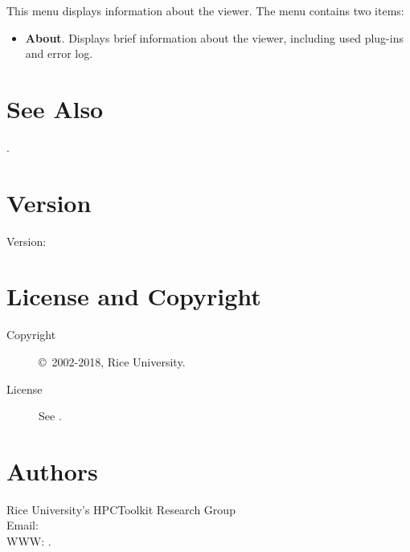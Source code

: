 \documentclass[english]{article}
\begin{document}
This menu displays information about the viewer. The menu contains two items:
\begin{itemize}

\item \textbf{About}.
  Displays brief information about the viewer, including used plug-ins and error log.

\end{itemize}





\section{See Also}

.

\section{Version}

Version: \Version

\section{License and Copyright}

\begin{description}
\item[Copyright] \copyright\ 2002-2018, Rice University.
\item[License] See .
\end{description}

\section{Authors}

\noindent
Rice University's HPCToolkit Research Group \\
Email:  \\
WWW: .

\LatexManEnd
\end{document}
